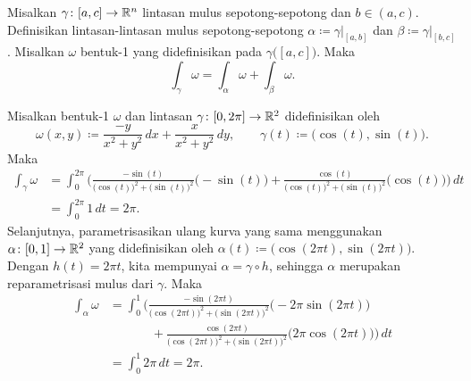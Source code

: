 \begin{prop} \label{mv:prop:pathconcat}
Misalkan $\gamma \colon [a,c] \to {\mathbb{R}}^n$ lintasan mulus sepotong-sepotong
dan $b \in (a,c)$.
Definisikan lintasan-lintasan mulus sepotong-sepotong
$\alpha \coloneqq \gamma|_{[a,b]}$ dan
$\beta \coloneqq \gamma|_{[b,c]}$.
Misalkan $\omega$ bentuk-1 yang didefinisikan pada
$\gamma\bigl([a,c]\bigr)$.  Maka
\begin{equation*}
\int_{\gamma} \omega =
\int_{\alpha} \omega +
\int_{\beta} \omega .
\end{equation*}
\end{prop}


\begin{example} \label{example:mv:irrotoneformint}
Misalkan bentuk-1 $\omega$ dan lintasan $\gamma \colon [0,2\pi] \to {\mathbb{R}}^2$ didefinisikan oleh
\begin{equation*}
\omega(x,y) \coloneqq \frac{-y}{x^2+y^2} \,dx + \frac{x}{x^2+y^2} \,dy,
\qquad
\gamma(t) \coloneqq \bigl(\cos(t),\sin(t)\bigr) .
\end{equation*}
Maka
\begin{equation*}
\begin{split}
\int_{\gamma} \omega
& =
\int_0^{2\pi}
\Biggl(
\frac{-\sin(t)}{{\bigl(\cos(t)\bigr)}^2+{\bigl(\sin(t)\bigr)}^2}
\bigl(-\sin(t)\bigr)
+
\frac{\cos(t)}{{\bigl(\cos(t)\bigr)}^2+{\bigl(\sin(t)\bigr)}^2}
\bigl(\cos(t)\bigr)
\Biggr) \, dt
\\
& =
\int_0^{2\pi}
1 \, dt
= 2\pi .
\end{split}
\end{equation*}
Selanjutnya, parametrisasikan ulang kurva yang sama menggunakan
$\alpha \colon [0,1] \to {\mathbb{R}}^2$ yang didefinisikan oleh $\alpha(t) \coloneqq \bigl(\cos(2\pi
t),\sin(2 \pi t)\bigr)$.  Dengan $h(t)=2\pi t$, kita mempunyai
$\alpha=\gamma\circ h$, sehingga $\alpha$ merupakan reparametrisasi mulus dari $\gamma$.
Maka
\begin{equation*}
\begin{split}
\int_{\alpha} \omega
& =
\int_0^{1}
\Biggl(
\frac{-\sin(2\pi t)}{{\bigl(\cos(2\pi t)\bigr)}^2+{\bigl(\sin(2\pi t)\bigr)}^2}
\bigl(-2\pi \sin(2\pi t)\bigr)
\\
& \phantom{=\int_0^1\Biggl(~}
+
\frac{\cos(2 \pi t)}{{\bigl(\cos(2 \pi t)\bigr)}^2+{\bigl(\sin(2 \pi t)\bigr)}^2}
\bigl(2 \pi \cos(2 \pi t)\bigr)
\Biggr) \, dt
\\
& =
\int_0^{1}
2\pi \, dt
= 2\pi .
\end{split}

\end{equation*}
\end{example}
